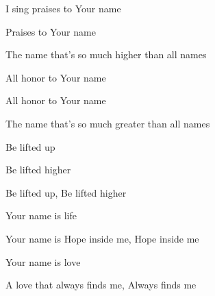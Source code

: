 \documentclass[9pt]{extarticle}
\begin{document}
\bsong

\bv
I sing praises to Your name

Praises to Your name

The name that’s so much higher than all names

All honor to Your name

All honor to Your name

The name that’s so much greater than all names
\ev

\bc
Be lifted up

Be lifted higher

Be lifted up, Be lifted higher
\ec



\bb
Your name is life

Your name is Hope inside me, Hope inside me

Your name is love

A love that always finds me, Always finds me
\eb


\esong
\end{document}
